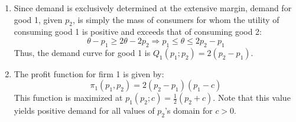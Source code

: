 \documentclass{article}
\begin{document}
\begin{enumerate}
\begin{enumerate}
    \item Since demand is exclusively determined at the extensive margin, demand for good 1, given $p_2$, is simply the mass of consumers for whom the utility of consuming good 1 is positive and exceeds that of consuming good 2:\[
      \theta - p_1 \geq 2\theta - 2p_2  \Rightarrow p_1 \leq \theta \leq 2p_2 - p_1
    \]
    Thus, the demand curve for good 1 is ${Q_1(p_1; p_2) = 2(p_2 - p_1)}$.

    \item The profit function for firm 1 is given by:\[
      \pi_1(p_1, p_2) =  2(p_2-p_1)(p_1 - c)
    \]
    This function is maximized at ${p_1(p_2; c)=\frac{1}{2}(p_2 + c)}$. Note that this value yields positive demand for all values of $p_2$'s domain for $c>0$.

  \end{enumerate}
\end{enumerate}

\end{document}
